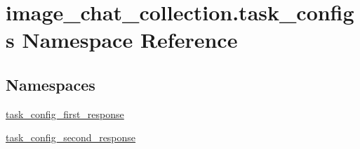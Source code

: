 \hypertarget{namespaceimage__chat__collection_1_1task__configs}{}\section{image\+\_\+chat\+\_\+collection.\+task\+\_\+configs Namespace Reference}
\label{namespaceimage__chat__collection_1_1task__configs}
\subsection*{Namespaces}
\begin{DoxyCompactItemize}
\item 
 \hyperlink{namespaceimage__chat__collection_1_1task__configs_1_1task__config__first__response}{task\+\_\+config\+\_\+first\+\_\+response}
\item 
 \hyperlink{namespaceimage__chat__collection_1_1task__configs_1_1task__config__second__response}{task\+\_\+config\+\_\+second\+\_\+response}
\end{DoxyCompactItemize}

